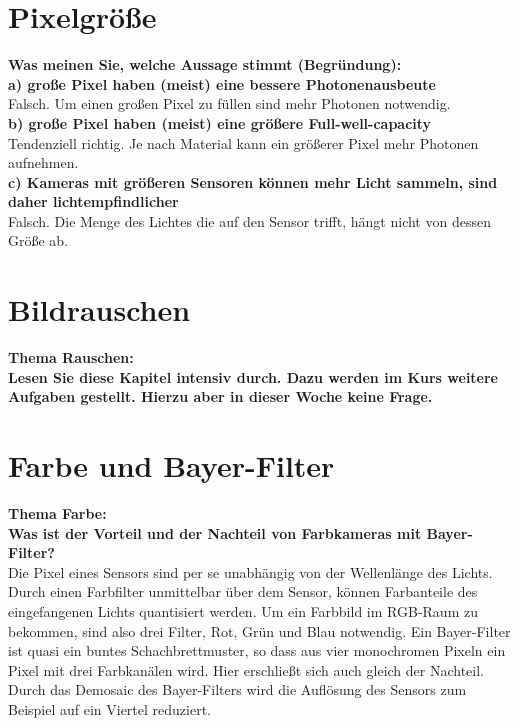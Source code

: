 \documentclass[a4paper]{article}
\begin{document}
	\section{Pixelgröße}
	\textbf{Was meinen Sie, welche Aussage stimmt (Begründung):}\\
	\textbf{a) große Pixel haben (meist) eine bessere Photonenausbeute}\\
	Falsch. Um einen großen Pixel zu füllen sind mehr Photonen notwendig.\\
	\textbf{b) große Pixel haben (meist) eine größere Full-well-capacity}\\
	Tendenziell richtig. Je nach Material kann ein größerer Pixel mehr Photonen aufnehmen.\\
	\textbf{c) Kameras mit größeren Sensoren können mehr Licht sammeln, sind daher
	lichtempfindlicher}\\
	Falsch. Die Menge des Lichtes die auf den Sensor trifft, hängt nicht von dessen Größe ab. 
	
	\section{Bildrauschen}
	\textbf{Thema Rauschen:}\\
	\textbf{Lesen Sie diese Kapitel intensiv durch. Dazu werden im Kurs weitere Aufgaben gestellt.
	Hierzu aber in dieser Woche keine Frage.}
	
	\section{Farbe und Bayer-Filter}
	\textbf{Thema Farbe:}\\
	\textbf{Was ist der Vorteil und der Nachteil von Farbkameras mit Bayer-Filter?}\\
	Die Pixel eines Sensors sind per se unabhängig von der Wellenlänge des Lichts. Durch einen Farbfilter unmittelbar über dem Sensor, können Farbanteile des eingefangenen Lichts quantisiert werden. Um ein Farbbild im RGB-Raum zu bekommen, sind also drei Filter, Rot, Grün und Blau notwendig. Ein Bayer-Filter ist quasi ein buntes Schachbrettmuster, so dass aus vier monochromen Pixeln ein Pixel mit drei Farbkanälen wird. Hier erschließt sich auch gleich der Nachteil. Durch das Demosaic des Bayer-Filters wird die Auflösung des Sensors zum Beispiel auf ein Viertel reduziert.
    
    \newpage
	
\end{document}
